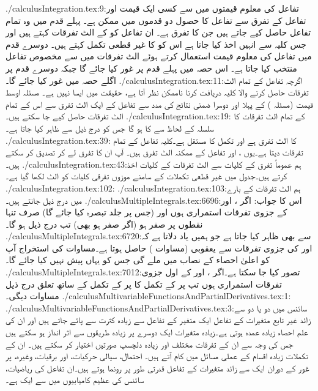 ./calculusIntegration.tex:9:تفاعل کی معلوم قیمتوں میں سے کسی ایک قیمت اور تفاعل کے تفرق  سے تفاعل کا حصول دو قدموں میں ممکن ہے۔ پہلے قدم میں وہ تمام تفاعل حاصل کیے جاتے ہیں جن کا تفرق  ہے۔ ان تفاعل کو  کے الٹ تفرقات کہتے ہیں اور جس کلیہ سے انہیں اخذ کیا جاتا ہے اس کو  کا غیر قطعی  تکمل  کہتے ہیں۔ دوسرے قدم میں تفاعل کی معلوم قیمت استعمال کرتے ہوئے الٹ تفرقات میں سے مخصوص تفاعل منتخب کیا جاتا ہے۔ اس حصہ میں پہلے قدم پر غور کیا جائے گا جبکہ دوسرے قدم پر اگلے حصہ میں غور کیا جائے گا۔
./calculusIntegration.tex:11:اگرچہ تفاعل کے تمام الٹ تفرقات حاصل کرنے والا کلیہ دریافت کرنا  ناممکن نظر آتا ہے، حقیقت میں ایسا نہیں ہے۔ مسئلہ اوسط قیمت (مسئلہ ) کے  پہلا اور دوسرا ضمنی نتائج کی مدد سے تفاعل کے  ایک الٹ تفرق سے اس کے تمام الٹ تفرقات حاصل کیے جا سکتے ہیں۔ 
./calculusIntegration.tex:19: کے تمام الٹ تفرقات کا سلسلہ  کے لحاظ سے  کا  ہو گا جس کو درج ذیل سے ظاہر کیا جاتا ہے۔
./calculusIntegration.tex:39: کا الٹ تفرق  ہے اور  تکمل کا مستقل ہے۔کلیہ  تفاعل  کے تمام تفرقات دیتا ہے۔یوں ،  اور  تفاعل  کے ممکنہ الٹ تفرق ہیں۔ آپ ان کا تفرق لے کر تصدیق کر سکتے ہیں۔
./calculusIntegration.tex:43:ہم عموماً تفرق کے کلیات سے الٹ تفرقات کے کلیات اخذ کرتے ہیں۔جدول  میں غیر قطعی تکملات کے سامنے موزوں تفرقی کلیات کو الٹ لکھا گیا ہے۔ 
./calculusIntegration.tex:102:
./calculusIntegration.tex:103:ہم الٹ تفرقات کے بارے میں درج ذیل جانتے ہیں۔
./calculusMultipleIntegrals.tex:6696:اس کا جواب: اگر ،  اور  کے جزوی تفرقات استمراری ہوں اور  (جس پر جلد تبصرہ کیا جائے گا) صرف  تنہا نقطوں پر صفر ہو (اگر صفر ہو بھی)  تب درج ذیل ہو گا۔ 
./calculusMultipleIntegrals.tex:6720:سے بھی ظاہر کیا جاتا ہے جو ہمیں یاد دلاتا ہے کہ  اور  کی جزوی تفرقات سے یعقوبی (مساوات )  حاصل ہوتا ہے۔مساوات  کی استخراج آپ کو اعلیٰ احصاء کے نصاب میں ملے گی جس کو یہاں پیش نہیں کیا جائے گا۔
./calculusMultipleIntegrals.tex:7012:تصور کیا جا سکتا ہے۔اگر ،   اور  کے اول جزوی تفرقات استمراری ہوں تب  پر  کے تکمل کا  پر  کے تکمل کے ساتھ تعلق درج ذیل مساوات دیگی۔
./calculusMultivariableFunctionsAndPartialDerivatives.tex:1:
./calculusMultivariableFunctionsAndPartialDerivatives.tex:3:سائنس میں دو یا دو سے زائد غیر تابع  متغیرات کے تفاعل    ایک متغیر کے تفاعل سے زیادہ کثرت سے پائے جاتے ہیں اور ان کی علم   احصاء  زیادہ  عمدہ   ہوتی  ہے۔زیادہ متغیرات ایک دوسرے پر زیادہ طریقوں سے اثر انداز ہو سکتے ہیں جس کی وجہ سے ان کے تفرقات    مختلف اور زیادہ دلچسپ  صورتیں اختیار  کر سکتے ہیں۔ ان کے تکملات  زیادہ اقسام کے عملی  مسائل میں کام آتے ہیں۔ احتمال،  سیالی حرکیات، اور برقیات، وغیرہ،    پر غور کے دوران  ایک سے زائد متغیرات  کے تفاعل قدرتی طور پر رونما ہوتے ہیں۔ان تفاعل کی  ریاضیات، سائنس کی عظیم  کامیابیوں میں  سے ایک ہے۔

